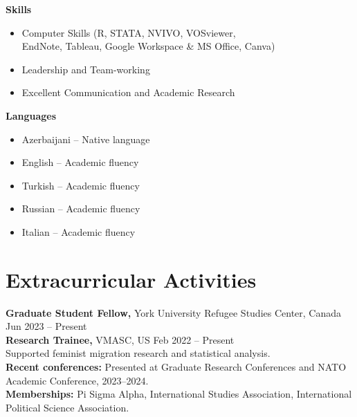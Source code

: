 \documentclass[10pt, a4paper]{article}
\begin{document}
\noindent
\begin{minipage}[t]{0.5\textwidth}
\textbf{Skills}
\begin{itemize}[noitemsep]
    \item Computer Skills (R, STATA, NVIVO, VOSviewer, \\ EndNote, Tableau, Google Workspace \& MS Office, Canva) 
    \item Leadership and Team-working
    \item Excellent Communication and Academic Research
\end{itemize}
\end{minipage}%
\hfill %
\begin{minipage}[t]{0.45\textwidth} %
\textbf{Languages}
\begin{itemize}[noitemsep]
    \item Azerbaijani – Native language
    \item English – Academic fluency
    \item Turkish – Academic fluency
    \item Russian – Academic fluency
    \item Italian – Academic fluency
\end{itemize}
\end{minipage}

\titlespacing*{\section}{0pt}{15pt}{2pt}
\section*{Extracurricular Activities}
\noindent \textbf{Graduate Student Fellow,} York University Refugee Studies Center, Canada
\vspace{5pt} \hspace{-6pt}
\hfill Jun 2023 – Present\\
\textbf{Research Trainee,} VMASC, US \hfill Feb 2022 – Present\\
{\small Supported feminist migration research and statistical analysis.
\vspace{5pt} \hspace{-6pt}
}\\
{\small \textbf{Recent conferences:} Presented at Graduate Research Conferences and NATO Academic Conference, 2023–2024.}\\
{\small \textbf{Memberships:} Pi Sigma Alpha, International Studies Association, International Political Science Association.}
\end{document}
